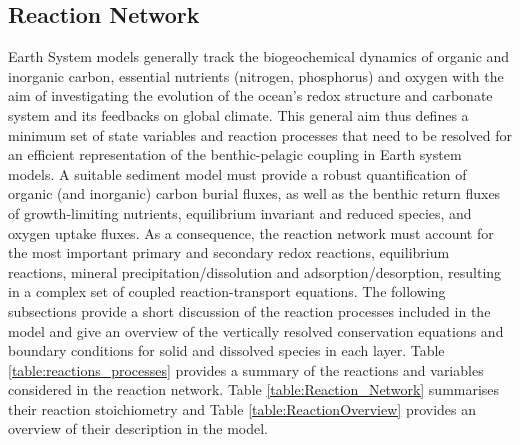 \documentclass[gmd, manuscript]{copernicus}
\begin{document}
\subsection{Reaction Network}\label{subsec:ReactionNetwork}
Earth System models generally track the biogeochemical dynamics of organic and inorganic carbon, essential nutrients (nitrogen, phosphorus) and oxygen with the aim of investigating the evolution 
of the ocean's redox structure and carbonate system and its feedbacks on global climate. This general aim thus defines a minimum set of state variables and reaction processes that need to be resolved for an efficient 
representation of the benthic-pelagic coupling in Earth system models. A suitable sediment model must provide a robust quantification of organic (and inorganic) carbon burial fluxes, as well as 
the benthic return fluxes of growth-limiting nutrients, equilibrium invariant and reduced species, and oxygen uptake fluxes. 
As a consequence, the reaction network must account for the most important primary and secondary redox reactions, equilibrium reactions, 
mineral precipitation/dissolution and adsorption/desorption, resulting in a complex set of coupled reaction-transport equations. The following 
subsections provide a short discussion of the reaction processes included in the model and give an overview of the 
vertically resolved conservation equations and boundary conditions for solid and dissolved species in each layer. 
Table \ref{table:reactions_processes} provides a summary of the reactions and variables considered in the reaction network. Table \ref{table:Reaction_Network} summarises their reaction stoichiometry 
and Table \ref{table:ReactionOverview} provides an overview of their description in the model.
\end{document}
